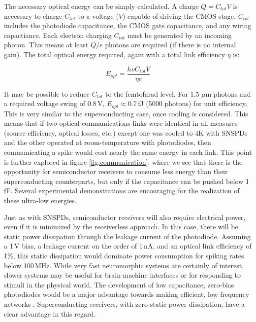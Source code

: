 \documentclass[twocolumn]{article}
\begin{document}
The necessary optical energy can be simply calculated. A charge $Q = C_{tot}V$ is necessary to charge $C_{tot}$ to a voltage ($V$) capable of driving the CMOS stage. $C_{tot}$ includes the photodiode capacitance, the CMOS gate capacitance, and any wiring capactiance. Each electron charging $C_{tot}$ must be generated by an incoming photon. This means at least $Q/e$ photons are required (if there is no internal gain). The total optical energy required, again with a total link efficiency $\eta$ is:

\begin{equation}
    E_{opt} = \frac{h \nu C_{tot} V}{\eta e}
\end{equation}

It may be possible to reduce $C_{tot}$ to the femtofarad level. For 1.5 $\mu$m photons and a required voltage swing of 0.8\,V, $E_{opt} \approx 0.7 $\,fJ (5000 photons) for unit efficiency. This is very similar to the superconducting case, once cooling is considered. This means that if two optical communications links were identical in all measures (source efficiency, optical losses, etc.) except one was cooled to 4K with SNSPDs and the other operated at room-temperature with photodiodes, then communicating a spike would cost nearly the same energy in each link. This point is further explored in figure \ref{fig:communication}, where we see that there is the opportunity for semiconductor receivers to consume less energy than their superconducting counterparts, but only if the capacitance can be pushed below 1\,fF. Several experimental demonstrations are encouraging for the realization of these ultra-low energies.

Just as with SNSPDs, semiconductor receivers will also require electrical power, even if it is minimized by the receiverless approach. In this case, there will be static power dissipation through the leakage current of the photodiode. Assuming a 1\,V bias, a leakage current on the order of 1\,nA, and an optical link efficiency of 1\%, this static dissipation would dominate power consumption for spiking rates below 100\,MHz. While very fast neuromorphic systems are certainly of interest, slower systems may be useful for brain-machine interfaces or for responding to stimuli in the physical world. The development of low capacitance, zero-bias photodiodes would be a major advantage towards making efficient, low frequency networks \cite{nozaki2018forward}. Superconducting receivers, with zero static power dissipation, have a clear advantage in this regard.
\end{document}
